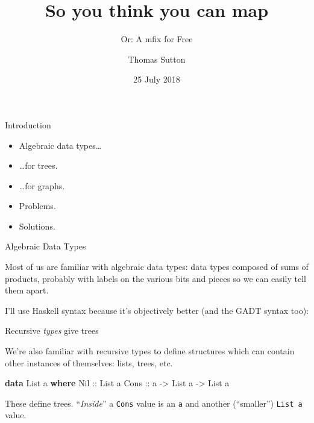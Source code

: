 \documentclass[ignorenonframetext]{beamer}
\title{So you think you can map}
\subtitle{Or: A mfix for Free}
\author{Thomas Sutton}
\date{25 July 2018}
\newenvironment{Shaded}{}{}
\newcommand{\DataTypeTok}[1]{\textcolor[rgb]{0.56,0.13,0.00}{#1}}
\newcommand{\KeywordTok}[1]{\textcolor[rgb]{0.00,0.44,0.13}{\textbf{#1}}}
\newcommand{\NormalTok}[1]{#1}
\newcommand{\OtherTok}[1]{\textcolor[rgb]{0.00,0.44,0.13}{#1}}
\providecommand{\tightlist}{%
  \setlength{\itemsep}{0pt}\setlength{\parskip}{0pt}}
\begin{document}
\frame{\titlepage}

\begin{frame}{%
\protect\hypertarget{introduction}{%
Introduction}}

\begin{itemize}
\tightlist
\item
  Algebraic data types\ldots{}
\item
  \ldots{}for trees.
\item
  \ldots{}for graphs.
\item
  Problems.
\item
  Solutions.
\end{itemize}

\end{frame}

\begin{frame}[fragile]{%
\protect\hypertarget{algebraic-data-types}{%
Algebraic Data Types}}

Most of us are familiar with algebraic data types: data types composed
of sums of products, probably with labels on the various bits and pieces
so we can easily tell them apart.

I’ll use Haskell syntax because it’s objectively better (and the GADT
syntax too):

\begin{Shaded}
  
\end{Shaded}
\end{frame}

\begin{frame}[fragile]{%
\protect\hypertarget{recursive-types-give-trees}{%
Recursive \emph{types} give trees}}

We’re also familiar with recursive types to define structures which can
contain other instances of themselves: lists, trees, etc.

\begin{Shaded}
\begin{Highlighting}[]
\KeywordTok{data} \DataTypeTok{List}\NormalTok{ a }\KeywordTok{where}
  \DataTypeTok{Nil}\OtherTok{  ::} \DataTypeTok{List}\NormalTok{ a}
  \DataTypeTok{Cons}\OtherTok{ ::}\NormalTok{ a }\OtherTok{->} \DataTypeTok{List}\NormalTok{ a }\OtherTok{->} \DataTypeTok{List}\NormalTok{ a}
\end{Highlighting}
\end{Shaded}

These define trees. “\emph{Inside}” a \texttt{Cons} value is an
\texttt{a} and another (“smaller”) \texttt{List\ a} value.

\end{frame}
\end{document}
